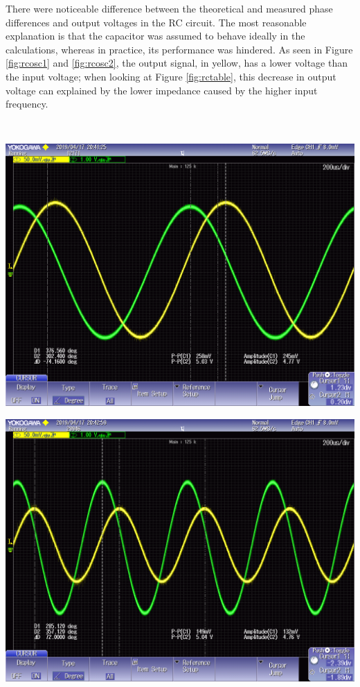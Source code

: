 \documentclass[journal]{IEEEtran}
\begin{document}
\noindent There were noticeable difference between the theoretical and measured phase differences and output voltages in the RC circuit. The most reasonable explanation is that the capacitor was assumed to behave ideally in the calculations, whereas in practice, its performance was hindered. As seen in Figure \ref{fig:rcosc1} and \ref{fig:rcosc2}, the output signal, in yellow, has a lower voltage than the input voltage; when looking at Figure \ref{fig:rctable}, this decrease in output voltage can explained by the lower impedance caused by the higher input frequency.

\\
\bigskip

\begingroup
    \centering
    \medskip
    \includegraphics[width=\columnwidth]{images/lab8_002.png}
    \label{fig:rcosc1}
    \medskip
\endgroup

\begingroup
    \centering
    \medskip
    \includegraphics[width=\columnwidth]{images/lab8_005.png}
    \label{fig:rcosc2}
    \medskip
\endgroup
\end{document}
